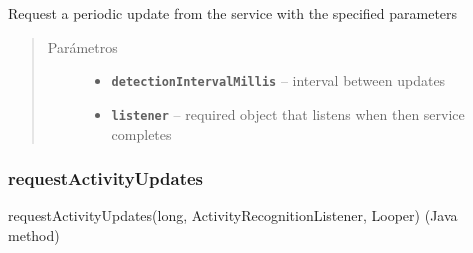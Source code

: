 \begin{fulllineitems}
\label{org/hardroid/api/ActivityRecognitionApi:org.hardroid.api.ActivityRecognitionApi.requestActivityUpdates(long, ActivityRecognitionListener)}\par
Request a periodic update from the service with the specified parameters
\begin{quote}\begin{description}
\item[{Parámetros}] \leavevmode\begin{itemize}
\item {} 
\textbf{\texttt{detectionIntervalMillis}} -- interval between updates

\item {} 
\textbf{\texttt{listener}} -- required object that listens when then service completes

\end{itemize}

\end{description}\end{quote}

\end{fulllineitems}



\subsubsection{requestActivityUpdates}
\label{org/hardroid/api/ActivityRecognitionApi:id3}requestActivityUpdates(long, ActivityRecognitionListener, Looper) (Java method)

